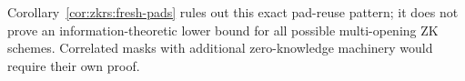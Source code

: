 \begin{remark}
Corollary~\ref{cor:zkrs:fresh-pads}
rules out this exact pad-reuse pattern;
it does not prove an information-theoretic
lower bound for all possible multi-opening
ZK schemes. Correlated masks with
additional zero-knowledge machinery
would require their own proof.
\end{remark}
